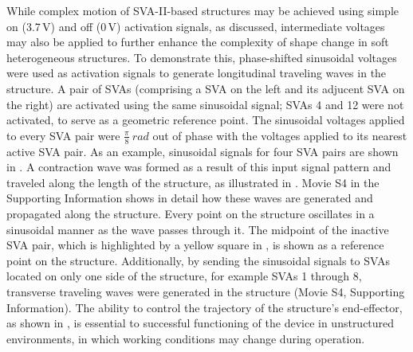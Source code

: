 While complex motion of SVA-II-based structures may be achieved using simple on 
(3.7\,V) and off (0\,V) activation signals, as discussed,
intermediate voltages may also be applied to further enhance the complexity of shape change in soft heterogeneous structures. To demonstrate this, phase-shifted sinusoidal voltages were used as activation signals to generate longitudinal traveling waves in the structure. 
A pair of SVAs (comprising a SVA on the left and its adjucent SVA on the right) are activated using the same sinusoidal signal; SVAs 4 and 12 were not activated, to serve as a geometric reference point.
 The sinusoidal voltages applied to every SVA pair were $\frac{\pi}{8}~rad$ out of phase with the voltages applied to its nearest active SVA pair. As an example, sinusoidal signals for four SVA pairs are shown in  . 
 A contraction wave was formed as a result of this input signal pattern and traveled along the length of the structure, as illustrated in . Movie S4 in the Supporting Information shows in detail how these waves are generated and propagated along the structure. Every point on the structure oscillates in a sinusoidal manner as the wave passes through it. The midpoint of the inactive SVA pair, which is highlighted by a yellow square in , is shown as a reference point on the structure. Additionally, by sending the sinusoidal signals to SVAs located on only one side of the structure, for example SVAs 1 through 8, transverse traveling waves were generated in the structure (Movie S4, Supporting Information).
The ability to control the trajectory of the structure's end-effector, as shown in , is essential to successful functioning of the device in unstructured environments, in which working conditions may change during operation.

